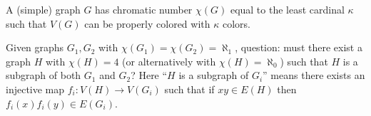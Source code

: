 A (simple) graph $G$ has chromatic number $\chi(G)$ equal to the least cardinal $\kappa$ such that $V(G)$ can be 
properly colored with $\kappa$ colors.

Given graphs $G_1,G_2$ with $\chi(G_1)=\chi(G_2)=\aleph_1$,
question: must there exist a graph $H$ with $\chi(H)=4$ (or alternatively with $\chi(H)=\aleph_0$) such that $H$ is a 
subgraph of both $G_1$ and $G_2$? Here ``$H$ is a subgraph of $G_i$'' means there exists an injective map 
$f_i:V(H)\to V(G_i)$ such that if $xy\in E(H)$ then $f_i(x)f_i(y)\in E(G_i)$.
